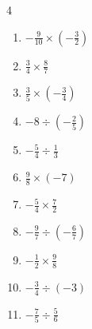 \begin{multicols}{4}
\begin{enumerate}

  \item $\displaystyle -\frac{9}{10}\times{}\left(-\frac{3}{2}\right)$


  \item $\displaystyle \frac{3}{4}\times{}\frac{8}{7}$


  \item $\displaystyle \frac{3}{5}\times{}\left(-\frac{3}{4}\right)$


  \item $\displaystyle -8\div{}\left(-\frac{2}{5}\right)$

        \phantom{$\displaystyle =20$}

  \item $\displaystyle -\frac{5}{4}\div{}\frac{1}{3}$


  \item $\displaystyle \frac{9}{8}\times{}\left(-7\right)$


  \item $\displaystyle -\frac{5}{4}\times{}\frac{7}{2}$


  \item $\displaystyle -\frac{9}{7}\div{}\left(-\frac{6}{7}\right)$


\columnbreak %

  \item $\displaystyle -\frac{1}{2}\times{}\frac{9}{8}$


  \item $\displaystyle -\frac{3}{4}\div{}\left(-3\right)$


  \item $\displaystyle -\frac{7}{5}\div{}\frac{5}{6}$



\end{enumerate}
\end{multicols}
